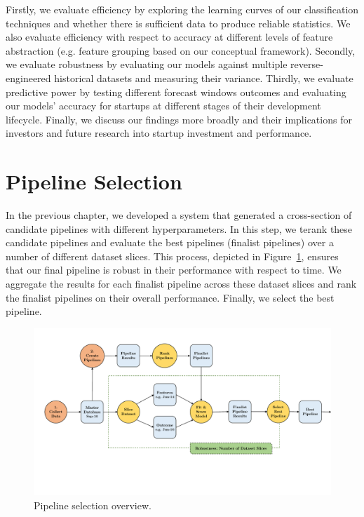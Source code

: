 \documentclass[../thesis/thesis.tex]{subfiles}
\begin{document}
Firstly, we evaluate efficiency by exploring the learning curves of our classification techniques and whether there is sufficient data to produce reliable statistics. We also evaluate efficiency with respect to accuracy at different levels of feature abstraction (e.g. feature grouping based on our conceptual framework). Secondly, we evaluate robustness by evaluating our models against multiple reverse-engineered historical datasets and measuring their variance. Thirdly, we evaluate predictive power by testing different forecast windows outcomes and evaluating our models’ accuracy for startups at different stages of their development lifecycle. Finally, we discuss our findings more broadly and their implications for investors and future research into startup investment and performance.

\section{Pipeline Selection}

In the previous chapter, we developed a system that generated a cross-section of candidate pipelines with different hyperparameters. In this step, we terank these candidate pipelines and evaluate the best pipelines (finalist pipelines) over a number of different dataset slices. This process, depicted in Figure~\ref{fig:evaluation:pipeline_selection}, ensures that our final pipeline is robust in their performance with respect to time. We aggregate the results for each finalist pipeline across these dataset slices and rank the finalist pipelines on their overall performance. Finally, we select the best pipeline.

\begin{figure}[!htb]
    \centering
    \includegraphics[width=\textwidth]{../figures/evaluation/pipeline_selection}
    \caption[Pipeline selection flowchart]{Pipeline selection overview.}
    \label{fig:evaluation:pipeline_selection}
\end{figure}
\end{document}
